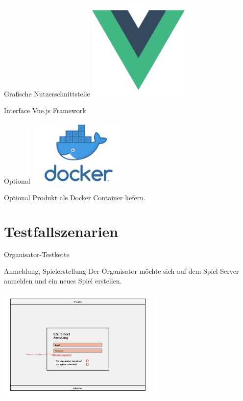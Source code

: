 \documentclass[xcolor=dvipsnames]{beamer}
\begin{document}
\begin{frame}{Grafische Nutzerschnittstelle}
    \centering
        \includegraphics[width=5cm]{img/vue.png}
        \begin{block}{Interface}
        Vue.js Framework
        \end{block}
\end{frame}
\begin{frame}{Optional}
    \centering
         \includegraphics[width=5cm]{img/docker.jpg}
         \begin{block}{Optional}
          Produkt als Docker Container liefern.
        \end{block}
\end{frame}
\section{Testfallszenarien}
    \begin{frame}{Organisator-Testkette}
        \begin{block} {Anmeldung, Spielerstellung}
            Der Organisator möchte sich auf dem Spiel-Server anmelden und ein neues Spiel erstellen.
        \end{block}
        \centering
        \includegraphics[width=8cm]{img/Anmeldung.jpg}
    \end{frame}
\end{document}
